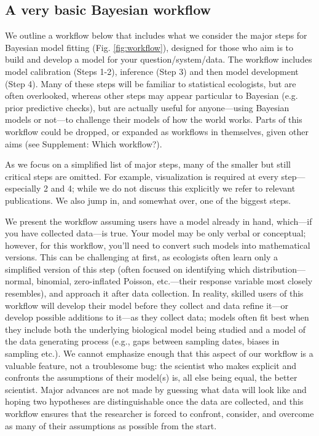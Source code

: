 \documentclass[11pt]{article}
\begin{document}
{\subsection*{A very basic Bayesian workflow}
We outline a workflow below that includes what we consider the major steps for Bayesian model fitting (Fig. \ref{fig:workflow}), designed for those who aim is to build and develop a model for
your question/system/data. The workflow includes model calibration (Steps 1-2), inference (Step 3) and then model development (Step 4). Many of these steps will be familiar to statistical ecologists, but are often overlooked, whereas other steps may appear particular to Bayesian (e.g. prior predictive checks), but are actually useful for anyone---using Bayesian models or not---to challenge their models of how the world works. Parts of this workflow could be dropped, or expanded as workflows in themselves, given other aims (see Supplement: Which workflow?). 

As we focus on a simplified list of major steps, many of the smaller but still critical steps are omitted. For example, visualization is required at every step---especially 2 and 4; while we do not discuss this explicitly we refer to relevant publications. We also jump in, and somewhat over, one of the biggest steps. 

We present the workflow assuming users have a model already in hand, which---if you have collected data---is true. Your model may be only verbal or conceptual; however, for this workflow, you'll need to convert such models into mathematical versions. This can be challenging at first, as ecologists often learn only a simplified version of this step (often focused on identifying which distribution---normal, binomial, zero-inflated Poisson, etc.---their response variable most closely resembles), and approach it after data collection. In reality, skilled users of this workflow will develop their model before they collect and data refine it---or develop possible additions to it---as they collect data; models often fit best when they include both the underlying biological model being studied and a model of the data generating process (e.g., gaps between sampling dates, biases in sampling etc.). We cannot emphasize enough that this aspect of our workflow is a valuable feature, not a troublesome bug: the scientist who makes explicit and confronts the assumptions of their model(s) is, all else being equal, the better scientist. Major advances are not made by guessing what data will look like and hoping two hypotheses are distinguishable once the data are collected, and this workflow ensures that the researcher is forced to confront, consider, and overcome as many of their assumptions as possible from the start.

}
\end{document}
